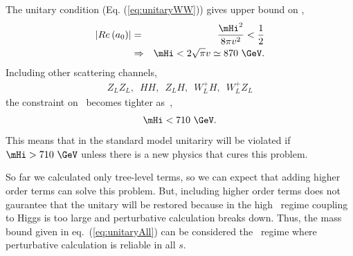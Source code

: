 The unitary condition (Eq. (\ref{eq:unitaryWW})) gives upper bound on \mHi, 
\begin{eqnarray} 
\left| Re \left( a_0 \right) \right| 
&=&  \frac{\mHi^2}{8\pi v^2} < \frac{1}{2} \\ 
&\Rightarrow& 
\mHi < 2 \sqrt{\pi} v \simeq 870~\GeV. 
\end{eqnarray} 
Including other scattering channels, 
\begin{eqnarray} 
Z_LZ_L, \,\,\, HH, \,\,\, Z_LH, \,\,\, W_L^+H, \,\,\, W^+_LZ_L 
\end{eqnarray} 
the constraint on \mHi\ becomes tighter as~\cite{Djouadi20081}, 
\begin{eqnarray} 
\label{eq:unitaryAll}
\mHi < 710~\GeV.
\end{eqnarray}
This means that in the standard model unitariry will be violated if $\mHi>710~\GeV$
unless there is a new physics that cures this problem. 

So far we calculated only tree-level terms, so we can expect that adding 
higher order terms can solve this problem. But, including higher order 
terms does not gaurantee that the unitary will be restored because 
in the high \mHi\ regime coupling to Higgs is too large and perturbative 
calculation breaks down. Thus, the mass bound given in eq.~(\ref{eq:unitaryAll})  
can be considered the \mHi~regime where perturbative calculation is reliable 
in all $s$.


